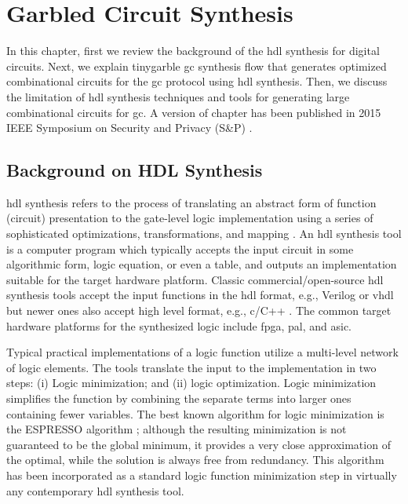 \chapter{Garbled Circuit Synthesis}\label{chap:syn}
In this chapter, first we review the background of the \acrshort{hdl} synthesis for digital circuits.
Next, we explain \gls{tinygarble} \acrshort{gc} synthesis flow that generates optimized combinational circuits for the \acrshort{gc} protocol using \acrshort{hdl} synthesis.
Then, we discuss the limitation of \acrshort{hdl} synthesis techniques and tools for generating large combinational circuits for \acrshort{gc}.
A version of chapter has been published in 2015 IEEE Symposium on Security and Privacy (S\&P) \cite{songhori2015tinygarble}.

\section{Background on HDL Synthesis}\label{sec:syn-back}
\acrshort{hdl} synthesis refers to the process of translating an abstract form of  function (circuit) presentation to the gate-level logic implementation using a series of sophisticated optimizations, transformations, and mapping \cite{sentovich1992sis,micheli1994synthesis,devadas1994logic,brayton1987mis}.
An \acrshort{hdl} synthesis tool is a computer program which typically accepts the input circuit in some algorithmic form, logic equation, or even a table, and outputs an implementation suitable for the target hardware platform.
Classic commercial/open-source \acrshort{hdl} synthesis tools accept the input functions in the \acrshort{hdl} format, e.g., Verilog or \gls{vhdl} \cite{tool:DesignCompiler,tool:ABC,tool:Encounter,tool:HDLdesigner,tool:PandA,decaluwe2004myhdl} but newer ones also accept high level format, e.g., \gls{c}/C++ \cite{Gupta2004, tool:Vivado}.
The common target hardware platforms for the synthesized logic include \acrfull{fpga}, \acrfull{pal}, and \acrfull{asic}.

Typical practical implementations of a logic function utilize a multi-level network of logic elements.
The tools translate the input to the implementation in two steps: (i) Logic minimization; and (ii) logic optimization.
Logic minimization simplifies the function by combining the separate terms into larger ones containing fewer variables.
The best known algorithm for logic minimization is the ESPRESSO algorithm \cite{brayton1984logic}; although the resulting minimization is not guaranteed to be the global minimum, it provides a very close approximation of the optimal, while the solution is always free from redundancy.
This algorithm has been incorporated as a standard logic function minimization step in virtually any contemporary \acrshort{hdl} synthesis tool.

